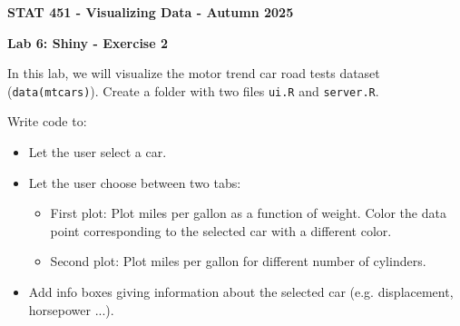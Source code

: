 \documentclass[letterpaper, 12pt]{article}
\begin{document}
\begin{center}
\textbf{\Large{STAT 451 - Visualizing Data - Autumn 2025}}
\end{center}

\vspace{2em}

\textbf{\large{Lab 6: Shiny - Exercise 2}}

\vspace{2em}

In this lab, we will visualize the motor trend car road tests dataset (\verb|data(mtcars)|). Create a folder with two files \verb|ui.R| and \verb|server.R|.

\vspace{1em}

Write code to:
\begin{itemize}
	\item Let the user select a car.
	\item Let the user choose between two tabs:
	\begin{itemize}
		\item First plot: Plot miles per gallon as a function of weight. Color the data point corresponding to the selected car with a different color.
		\item Second plot: Plot miles per gallon for different number of cylinders.
	\end{itemize}
	\item Add info boxes giving information about the selected car (e.g. displacement, horsepower ...).
\end{itemize}

\vspace{1em}
 
\end{document}

